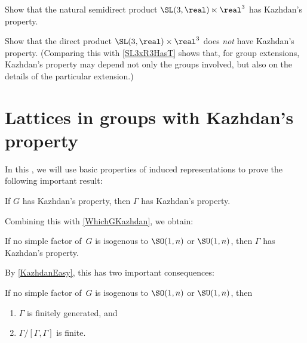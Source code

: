 \begin{exercises}
\item \label{SL3xR3HasT}
Show that the natural semidirect product $\SL(3,\real) \ltimes \real^3$ has Kazhdan's property.

\item Show that the direct product $\SL(3,\real) \times \real^3$ does \emph{not} have Kazhdan's property. (Comparing this with \cref{SL3xR3HasT} shows that, for group extensions, Kazhdan's property may depend not only the groups involved, but also on the details of the particular extension.)

\end{exercises}



\section{Lattices in groups with Kazhdan's property} \label{LattInTSect}

In this , we will use basic properties of induced representations to prove the following important result:

\begin{prop} \label{Kazhdan:G->Gamma}
 If $G$ has Kazhdan's property, then  $\Gamma$ has
Kazhdan's property.
 \end{prop}
  
 Combining this with \cref{WhichGKazhdan}, we obtain:
 
\begin{cor} \label{GammaHasT}
\label{Kazhdanlattice}
 If no simple factor of~$G$ is isogenous to\/ $\SO(1,n)$ or\/
$\SU(1,n)$, then\/  $\Gamma$ has Kazhdan's property.
\end{cor}

By \cref{KazhdanEasy}, this has two important consequences:

\begin{cor} \label{KazhdanlatticeCor}
 If no simple factor of~$G$ is isogenous to\/ $\SO(1,n)$ or\/
$\SU(1,n)$, then 
 \begin{enumerate}
\item \label{KazhdanlatticeCor-fg}
 $\Gamma $ is finitely generated,
 and
 \item \label{KazhdanlatticeCor-noabel}
 $\Gamma/[\Gamma ,\Gamma ]$ is finite.
   \end{enumerate}
\end{cor}

